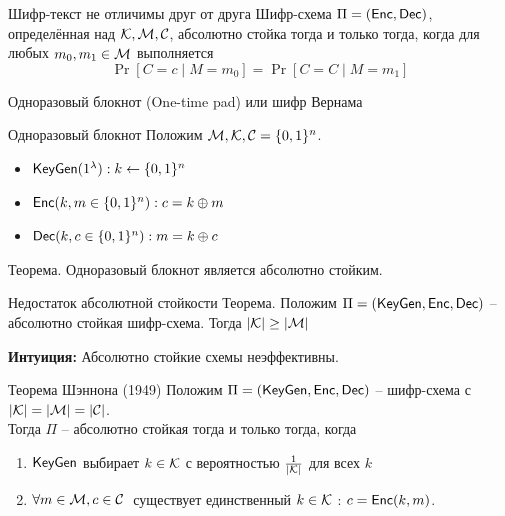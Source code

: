 \documentclass[usenames,dvipsnames,8pt,aspectratio=169]{beamer}
\begin{document}
\begin{frame}{Шифр-текст не отличимы друг от друга}
	\Large
	\vspace{-50pt}
	Шифр-схема $\Pi = (\textsf{Enc}, \textsf{Dec})$, определённая над $\mathcal{K}, \mathcal{M}, \mathcal{C}$, абсолютно стойка тогда и только тогда, когда для любых $m_0, m_1 \in \mathcal{M}$ выполняется
	\[
	\Pr[C = c \; | \; M = m_0] = \Pr[C = C \; | \; M = m_1]
	\]
\end{frame}

\begin{frame}{Одноразовый блокнот (One-time pad) или шифр Вернама }
\LARGE
\vspace{-40pt}
\begin{block}{Одноразовый блокнот}
	Положим $\mathcal{M}, \mathcal{K}, \mathcal{C} = \{0,1\}^n$.
	\begin{itemize}
		\item $\textsf{KeyGen}(1^{\lambda}): k \leftarrow \{0,1\}^n$ \\[10pt]
		\item $\textsf{Enc}(k, m \in \{0,1\}^n): c = k \oplus m$ \\[10pt]
		\item $\textsf{Dec}(k, c \in \{0,1\}^n): m = k \oplus c$ \\[10pt]
	\end{itemize}
\end{block}

{\color{Orange} Теорема.}
	Одноразовый блокнот является абсолютно  стойким.


\end{frame}

\begin{frame}{Недостаток абсолютной стойкости }
\LARGE
{\color{Orange} Теорема.} Положим $\Pi = (\textsf{KeyGen}, \textsf{Enc}, \textsf{Dec})$  -- абсолютно стойкая шифр-схема. Тогда $\left\lvert\mathcal{K}\right\rvert \geq \left\lvert\mathcal{M}\right\rvert$
\vspace{40pt}

\textbf{Интуиция:} Абсолютно стойкие схемы неэффективны.
\end{frame}

\begin{frame}{Теорема Шэннона (1949)}
\LARGE
\vspace{-70pt}
Положим $\Pi = (\textsf{KeyGen}, \textsf{Enc}, \textsf{Dec})$  -- шифр-схема с $\left\lvert\mathcal{K}\right\rvert=\left\lvert\mathcal{M}\right\rvert =\left\lvert\mathcal{C}\right\rvert $. \\[3pt]
Тогда $\Pi$ --  абсолютно стойкая тогда и только тогда, когда\\[6pt]
\begin{enumerate}
	\itemsep 7pt
	\item $\textsf{KeyGen}$ выбирает $k \in \mathcal{K}$ с вероятностью $\frac{1}{\left\lvert\mathcal{K}\right\rvert}$ для всех $k$
	\item $\forall m \in \mathcal{M}, c \in \mathcal{C} \;$ существует единственный $ k \in \mathcal{K}$ : $c = \textsf{Enc}(k, m)$.
\end{enumerate}
		
\end{frame}
\end{document}
